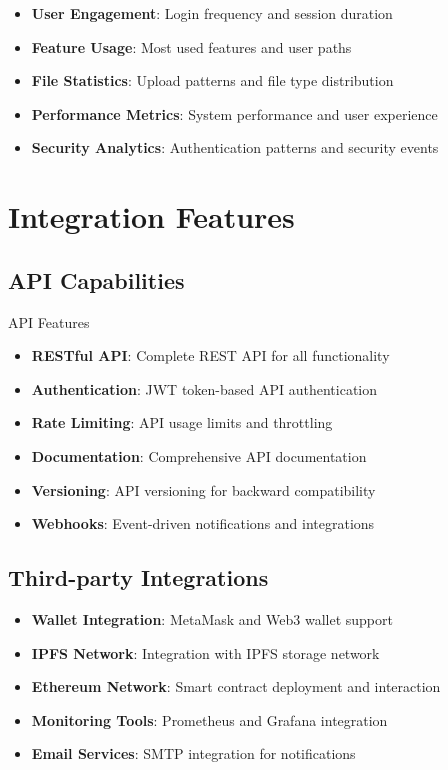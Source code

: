 \documentclass[11pt,a4paper]{article}
\begin{document}
\begin{itemize}
    \item \textbf{User Engagement}: Login frequency and session duration
    \item \textbf{Feature Usage}: Most used features and user paths
    \item \textbf{File Statistics}: Upload patterns and file type distribution
    \item \textbf{Performance Metrics}: System performance and user experience
    \item \textbf{Security Analytics}: Authentication patterns and security events
\end{itemize}

\section{Integration Features}

\subsection{API Capabilities}

\begin{techbox}{\faPlug\space API Features}
\begin{itemize}
    \item \textbf{RESTful API}: Complete REST API for all functionality
    \item \textbf{Authentication}: JWT token-based API authentication
    \item \textbf{Rate Limiting}: API usage limits and throttling
    \item \textbf{Documentation}: Comprehensive API documentation
    \item \textbf{Versioning}: API versioning for backward compatibility
    \item \textbf{Webhooks}: Event-driven notifications and integrations
\end{itemize}
\end{techbox}

\subsection{Third-party Integrations}

\begin{itemize}
    \item \textbf{Wallet Integration}: MetaMask and Web3 wallet support
    \item \textbf{IPFS Network}: Integration with IPFS storage network
    \item \textbf{Ethereum Network}: Smart contract deployment and interaction
    \item \textbf{Monitoring Tools}: Prometheus and Grafana integration
    \item \textbf{Email Services}: SMTP integration for notifications
\end{itemize}
\end{document}
